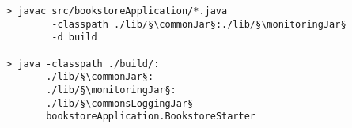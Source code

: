 \begin{lstlisting}[caption=Compile and run under Linux]
> javac src/bookstoreApplication/*.java
        -classpath ./lib/§\commonJar§:./lib/§\monitoringJar§
        -d build

> java -classpath ./build/:
       ./lib/§\commonJar§:
       ./lib/§\monitoringJar§:
       ./lib/§\commonsLoggingJar§
       bookstoreApplication.BookstoreStarter 
\end{lstlisting}
